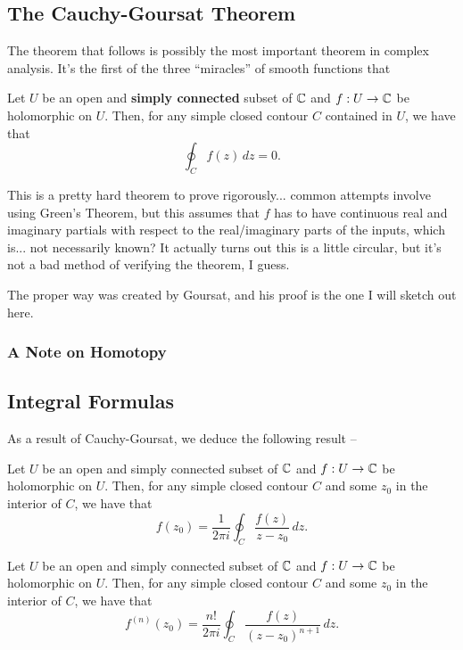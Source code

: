 \subsection{The Cauchy-Goursat Theorem}
The theorem that follows is possibly the most important theorem in complex analysis. It's the first of the three ``miracles'' of smooth functions that
\begin{theorem}
  Let $U$ be an open and \textbf{simply connected} subset of $\mathbb C$ and $f : U \to \mathbb C$ be holomorphic on $U$. Then, for any simple closed contour $C$ contained in $U$, we have that \[\oint_C f(z) \, dz = 0.\]
\end{theorem}

This is a pretty hard theorem to prove rigorously... common attempts involve using Green's Theorem, but this assumes that $f$ has to have continuous real and imaginary partials with respect to the real/imaginary parts of the inputs, which is... not necessarily known? It actually turns out this is a little circular, but it's not a bad method of verifying the theorem, I guess.

The proper way was created by Goursat, and his proof is the one I will sketch out here.


\subsubsection{A Note on Homotopy}


\subsection{Integral Formulas}
As a result of Cauchy-Goursat, we deduce the following result --
\begin{theorem}
  Let $U$ be an open and simply connected subset of $\mathbb C$ and $f : U \to \mathbb C$ be holomorphic on $U$. Then, for any simple closed contour $C$ and some $z_0$ in the interior of $C$, we have that \[f(z_0) = \frac 1{2\pi i}\oint_C \frac{f(z)}{z-z_0} \, dz. \]
\end{theorem}

\begin{theorem}
  Let $U$ be an open and simply connected subset of $\mathbb C$ and $f : U \to \mathbb C$ be holomorphic on $U$. Then, for any simple closed contour $C$ and some $z_0$ in the interior of $C$, we have that \[f^{(n)}(z_0) = \frac {n!}{2\pi i}\oint_C \frac{f(z)}{(z-z_0)^{n+1}} \, dz. \]
\end{theorem}

